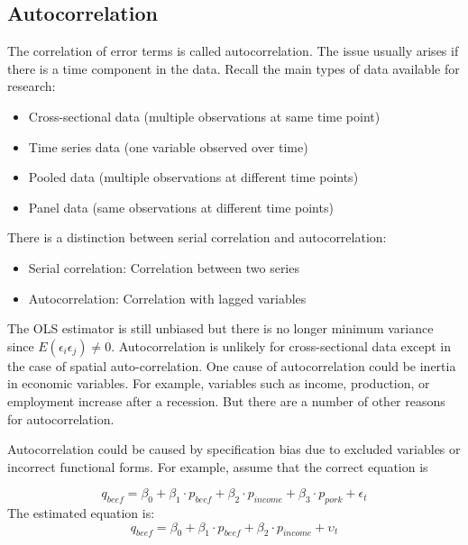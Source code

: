 \documentclass[
]{article}
\providecommand{\tightlist}{%
  \setlength{\itemsep}{0pt}\setlength{\parskip}{0pt}}
\begin{document}
\hypertarget{autocorrelation}{%
\subsection{Autocorrelation}\label{autocorrelation}}

The correlation of error terms is called autocorrelation. The issue usually arises if there is a time component in the data. Recall the main types of data available for research:

\begin{itemize}
\tightlist
\item
  Cross-sectional data (multiple observations at same time point)
\item
  Time series data (one variable observed over time)
\item
  Pooled data (multiple observations at different time points)
\item
  Panel data (same observations at different time points)
\end{itemize}

There is a distinction between serial correlation and autocorrelation:

\begin{itemize}
\tightlist
\item
  Serial correlation: Correlation between two series
\item
  Autocorrelation: Correlation with lagged variables
\end{itemize}

The OLS estimator is still unbiased but there is no longer minimum variance since \(E(\epsilon_i \epsilon_j) \neq 0\). Autocorrelation is unlikely for cross-sectional data except in the case of spatial auto-correlation. One cause of autocorrelation could be inertia in economic variables. For example, variables such as income, production, or employment increase after a recession. But there are a number of other reasons for autocorrelation.

Autocorrelation could be caused by specification bias due to excluded variables or incorrect functional forms. For example, assume that the correct equation is

\[q_{beef}=\beta_0+\beta_1 \cdot p_{beef}+\beta_2 \cdot p_{income} + \beta_3 \cdot p_{pork}+\epsilon_t\]
The estimated equation is:
\[q_{beef}=\beta_0+\beta_1 \cdot p_{beef}+\beta_2 \cdot p_{income}+\upsilon_t\]
\end{document}
